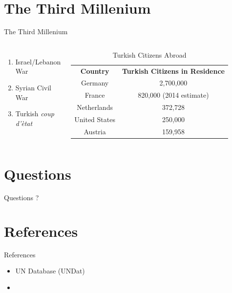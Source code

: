 \documentclass{beamer}
\begin{document}
\section{The Third Millenium}
\begin{frame}{The Third Millenium}
	\begin{columns}
			\begin{enumerate}
				\item Israel/Lebanon War
				\item Syrian Civil War
				\item Turkish \emph{coup d'\`{e}tat}
			\end{enumerate}
		
		\begin{table}[ht]
			\centering
			\begin{tabular}{|c|c|}
				\hline
				\bf{Country} & \bf{Turkish Citizens in Residence}\\
				\hhline
				Germany & 2,700,000\\
				\hline
				France & 820,000 (2014 estimate)\\
				\hline
				Netherlands & 372,728\\
				\hline
				United States & 250,000\\
				\hline
				Austria & 159,958\\
				\hline
			\end{tabular}
			\caption{Turkish Citizens Abroad}
		\end{table}
	\end{columns}
\end{frame}

\section*{Questions}
\begin{frame}{Questions}
\centering
\vcenter
	\Huge?
\end{frame}

\section*{References}
\begin{frame}{References}
	\begin{itemize}
		\item UN Database (UNDat)
		\item 
	\end{itemize}
	
\end{frame}
\end{document}
